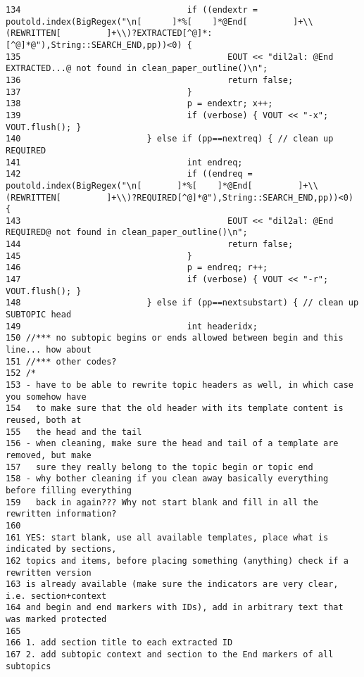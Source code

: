 \begin{verbatim}
134                                 if ((endextr = poutold.index(BigRegex("\n[      ]*%[    ]*@End[         ]+\\(REWRITTEN[         ]+\\)?EXTRACTED[^@]*:[^@]*@"),String::SEARCH_END,pp))<0) {
135                                         EOUT << "dil2al: @End EXTRACTED...@ not found in clean_paper_outline()\n";
136                                         return false;
137                                 }
138                                 p = endextr; x++;
139                                 if (verbose) { VOUT << "-x"; VOUT.flush(); }
140                         } else if (pp==nextreq) { // clean up REQUIRED
141                                 int endreq;
142                                 if ((endreq = poutold.index(BigRegex("\n[       ]*%[    ]*@End[         ]+\\(REWRITTEN[         ]+\\)?REQUIRED[^@]*@"),String::SEARCH_END,pp))<0) {
143                                         EOUT << "dil2al: @End REQUIRED@ not found in clean_paper_outline()\n";
144                                         return false;
145                                 }
146                                 p = endreq; r++;
147                                 if (verbose) { VOUT << "-r"; VOUT.flush(); }
148                         } else if (pp==nextsubstart) { // clean up SUBTOPIC head
149                                 int headeridx;
150 //*** no subtopic begins or ends allowed between begin and this line... how about
151 //*** other codes?
152 /*
153 - have to be able to rewrite topic headers as well, in which case you somehow have
154   to make sure that the old header with its template content is reused, both at
155   the head and the tail
156 - when cleaning, make sure the head and tail of a template are removed, but make
157   sure they really belong to the topic begin or topic end
158 - why bother cleaning if you clean away basically everything before filling everything
159   back in again??? Why not start blank and fill in all the rewritten information?
160   
161 YES: start blank, use all available templates, place what is indicated by sections,
162 topics and items, before placing something (anything) check if a rewritten version
163 is already available (make sure the indicators are very clear, i.e. section+context
164 and begin and end markers with IDs), add in arbitrary text that was marked protected
165 
166 1. add section title to each extracted ID
167 2. add subtopic context and section to the End markers of all subtopics

\end{verbatim}
